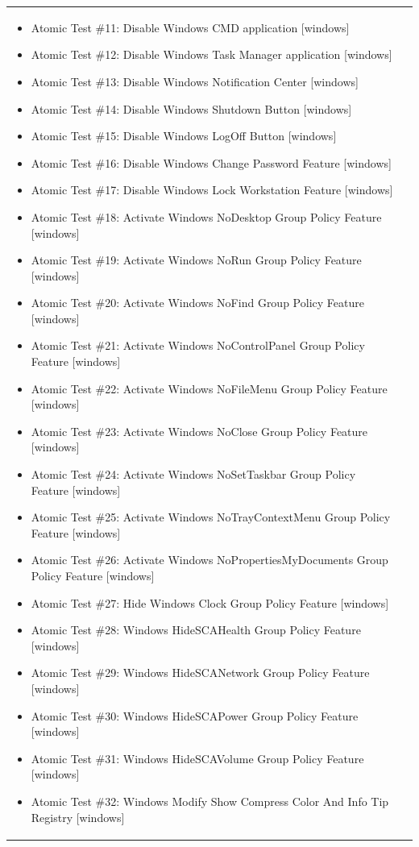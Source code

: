\begin{longtable}{p{} p{}}
\begin{itemize}[leftmargin=*, nosep, topsep=0pt]
  \item Atomic Test \#11: Disable Windows CMD application [windows]
  \item Atomic Test \#12: Disable Windows Task Manager application [windows]
  \item Atomic Test \#13: Disable Windows Notification Center [windows]
  \item Atomic Test \#14: Disable Windows Shutdown Button [windows]
  \item Atomic Test \#15: Disable Windows LogOff Button [windows]
  \item Atomic Test \#16: Disable Windows Change Password Feature [windows]
  \item Atomic Test \#17: Disable Windows Lock Workstation Feature [windows]
  \item Atomic Test \#18: Activate Windows NoDesktop Group Policy Feature [windows]
  \item Atomic Test \#19: Activate Windows NoRun Group Policy Feature [windows]
  \item Atomic Test \#20: Activate Windows NoFind Group Policy Feature [windows]
  \item Atomic Test \#21: Activate Windows NoControlPanel Group Policy Feature [windows]
  \item Atomic Test \#22: Activate Windows NoFileMenu Group Policy Feature [windows]
  \item Atomic Test \#23: Activate Windows NoClose Group Policy Feature [windows]
  \item Atomic Test \#24: Activate Windows NoSetTaskbar Group Policy Feature [windows]
  \item Atomic Test \#25: Activate Windows NoTrayContextMenu Group Policy Feature [windows]
  \item Atomic Test \#26: Activate Windows NoPropertiesMyDocuments Group Policy Feature [windows]
  \item Atomic Test \#27: Hide Windows Clock Group Policy Feature [windows]
  \item Atomic Test \#28: Windows HideSCAHealth Group Policy Feature [windows]
  \item Atomic Test \#29: Windows HideSCANetwork Group Policy Feature [windows]
  \item Atomic Test \#30: Windows HideSCAPower Group Policy Feature [windows]
  \item Atomic Test \#31: Windows HideSCAVolume Group Policy Feature [windows]
  \item Atomic Test \#32: Windows Modify Show Compress Color And Info Tip Registry [windows]

\end{itemize}
\end{longtable}
